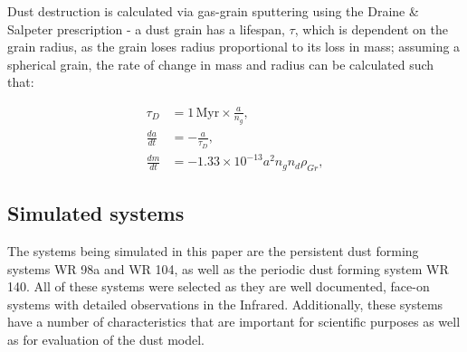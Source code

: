 Dust destruction is calculated via gas-grain sputtering using the Draine \& Salpeter prescription - a dust grain has a lifespan, $\tau$, which is dependent on the grain radius, as the grain loses radius proportional to its loss in mass; assuming a spherical grain, the rate of change in mass and radius can be calculated such that:

\begin{subequations}
  \begin{align}
           \tau_D & = 1 \, \text{Myr} \times \frac{a}{n_g} , \\
    \frac{da}{dt} & = - \frac{a}{\tau_D} , \\
    \frac{dm}{dt} & = -1.33 \times 10^{-13} a^2 n_g n_d \rho_{Gr} ,
  \end{align}
\end{subequations}


\subsection{Simulated systems}

The systems being simulated in this paper are the persistent dust forming systems WR 98a and WR 104, as well as the periodic dust forming system WR 140. All of these systems were selected as they are well documented, face-on systems with detailed observations in the Infrared. Additionally, these systems have a number of characteristics that are important for scientific purposes as well as for evaluation of the dust model.


\begin{table}[h]
  \centering
  \caption{Wind properties of systems simulated in this paper.}
  \label{tab:systems-wind-properties}
\end{table}

